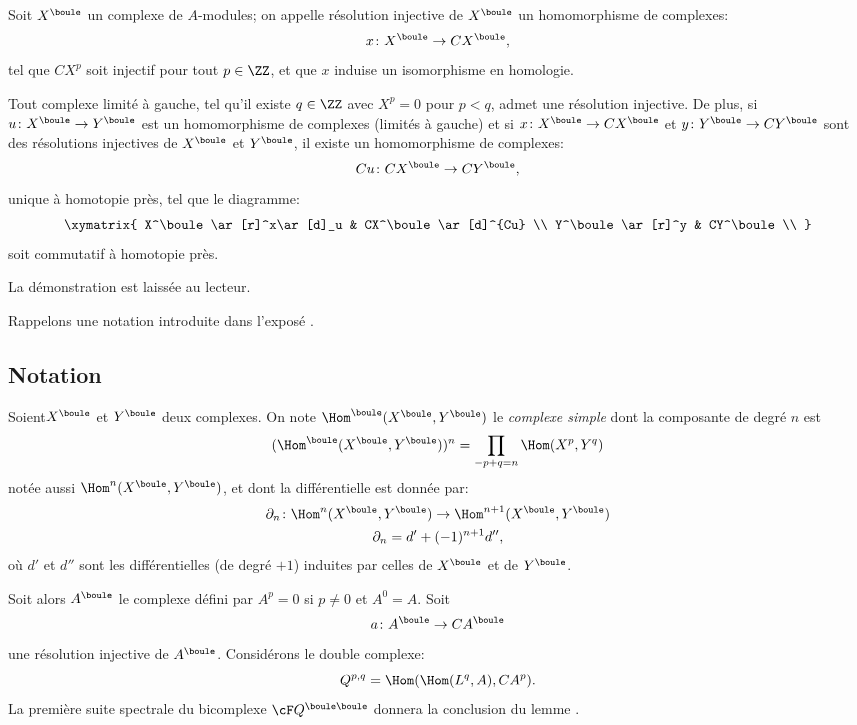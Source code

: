 \begin{definition} \label{VIII.1.3} Soit $X^\boule$ un complexe de $A$-modules; on appelle r\'esolution injective de $X^\boule$ un homomorphisme de complexes:
\[x\colon X^\boule\to CX^\boule, \]
tel que $CX^p$ soit injectif pour tout $p\in \ZZ$, et que $x$ induise un isomorphisme en homologie.
\end{definition}

\begin{proposition} \label{VIII.1.4} Tout complexe limit\'e \`a gauche, \ie tel qu'il existe $q\in\ZZ$ avec $X^p=0$ pour $p<q$, admet une r\'esolution injective. De plus, si $u\colon X^\boule\to Y^\boule$ est un homomorphisme de complexes (limit\'es \`a gauche) et si $x\colon X^\boule \to CX^\boule$ et $y\colon Y^\boule\to CY^\boule$ sont des r\'esolutions injectives de $X^\boule$ et $Y^\boule$, il existe un homomorphisme de complexes:
\[Cu\colon CX^\boule\to CY^\boule, \]
unique \`a homotopie pr\`es, tel que le diagramme:
\[
\xymatrix{ X^\boule \ar[r]^x\ar[d]_u & CX^\boule\ar[d]^{Cu} \\
Y^\boule \ar[r]^y & CY^\boule \\
}\]
soit commutatif \`a homotopie pr\`es.
\end{proposition}

La d\'emonstration est laiss\'ee au lecteur.

Rappelons une notation introduite dans l'expos\'e .

\subsection*{Notation}
Soient\pageoriginale $X^\boule$ et $Y^\boule$ deux complexes. On note $\Hom^\boule(X^\boule, Y^\boule)$ le \emph{complexe simple} dont la composante de degr\'e $n$ est
\[(\Hom^\boule(X^\boule, Y^\boule))^n=\prod_{-p+q=n}\Hom(X^p, Y^q)\]
not\'ee aussi $\Hom^n(X^\boule, Y^\boule)$, et dont la diff\'erentielle est donn\'ee par:
\begin{gather*}
\partial_n\colon \Hom^n(X^\boule, Y^\boule)\to \Hom^{n+1}(X^\boule, Y^\boule)\\
\partial_n=d'+(-1)^{n+1}d'',
\end{gather*}
o\`u $d'$ et $d''$ sont les diff\'erentielles (de degr\'e $+1$) induites par celles de $X^\boule$ et de $Y^\boule$.

\setcounter{equation}{1} Soit alors $A^\boule$ le complexe d\'efini par $A^p=0$ si $p\neq 0$ et $A^0=A$. Soit
\[a\colon A^\boule \to CA^\boule\]
une r\'esolution injective de $A^\boule$. Consid\'erons le double complexe:
\begin{equation} \label{eq:VIII.1.2} Q^{p, q}=\Hom(\Hom(L^q, A), CA^p).
\end{equation}
La premi\`ere suite spectrale du bicomplexe ${\cF}Q^{\boule\boule}$ donnera la conclusion du lemme .

